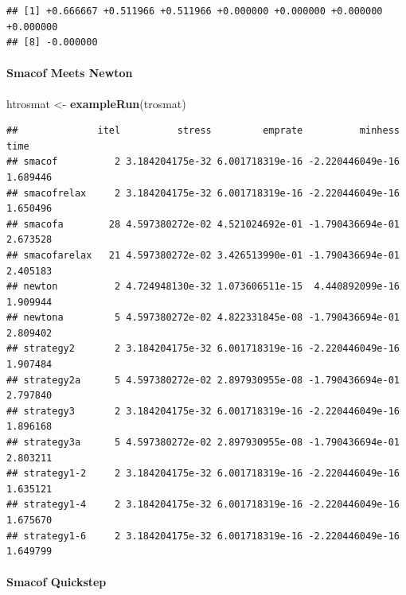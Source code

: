 \documentclass[
  12pt,
]{article}
\newenvironment{Shaded}{\begin{snugshade}}{\end{snugshade}}
\newcommand{\AttributeTok}[1]{\textcolor[rgb]{0.13,0.29,0.53}{#1}}
\newcommand{\DecValTok}[1]{\textcolor[rgb]{0.00,0.00,0.81}{#1}}
\newcommand{\FunctionTok}[1]{\textcolor[rgb]{0.13,0.29,0.53}{\textbf{#1}}}
\newcommand{\NormalTok}[1]{#1}
\newcommand{\OtherTok}[1]{\textcolor[rgb]{0.56,0.35,0.01}{#1}}
\newcommand{\SpecialCharTok}[1]{\textcolor[rgb]{0.81,0.36,0.00}{\textbf{#1}}}
\begin{document}
\begin{verbatim}
## [1] +0.666667 +0.511966 +0.511966 +0.000000 +0.000000 +0.000000 +0.000000
## [8] -0.000000
\end{verbatim}

\paragraph{Smacof Meets Newton}\label{smacof-meets-newton}

\begin{Shaded}
\begin{Highlighting}[]
\NormalTok{htrosmat }\OtherTok{\textless{}{-}} \FunctionTok{exampleRun}\NormalTok{(trosmat)}
\end{Highlighting}
\end{Shaded}

\begin{verbatim}
##              itel          stress         emprate          minhess     time
## smacof          2 3.184204175e-32 6.001718319e-16 -2.220446049e-16 1.689446
## smacofrelax     2 3.184204175e-32 6.001718319e-16 -2.220446049e-16 1.650496
## smacofa        28 4.597380272e-02 4.521024692e-01 -1.790436694e-01 2.673528
## smacofarelax   21 4.597380272e-02 3.426513990e-01 -1.790436694e-01 2.405183
## newton          2 4.724948130e-32 1.073606511e-15  4.440892099e-16 1.909944
## newtona         5 4.597380272e-02 4.822331845e-08 -1.790436694e-01 2.809402
## strategy2       2 3.184204175e-32 6.001718319e-16 -2.220446049e-16 1.907484
## strategy2a      5 4.597380272e-02 2.897930955e-08 -1.790436694e-01 2.797840
## strategy3       2 3.184204175e-32 6.001718319e-16 -2.220446049e-16 1.896168
## strategy3a      5 4.597380272e-02 2.897930955e-08 -1.790436694e-01 2.803211
## strategy1-2     2 3.184204175e-32 6.001718319e-16 -2.220446049e-16 1.635121
## strategy1-4     2 3.184204175e-32 6.001718319e-16 -2.220446049e-16 1.675670
## strategy1-6     2 3.184204175e-32 6.001718319e-16 -2.220446049e-16 1.649799
\end{verbatim}

\paragraph{Smacof Quickstep}\label{smacof-quickstep}

\begin{Shaded}
\end{Shaded}
\end{document}
